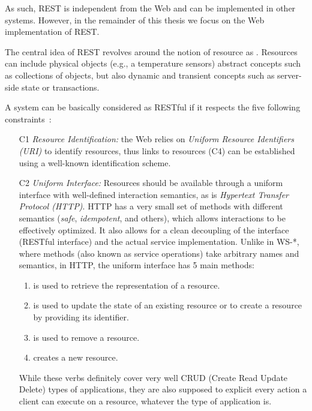 As such, REST is independent from the Web and can be implemented in other systems. However, in the remainder of this thesis we focus on the Web implementation of REST.

The central idea of REST revolves around the notion of resource as . Resources can include physical objects (e.g., a temperature sensors) abstract concepts such as collections of objects, but also dynamic and transient concepts such as server-side state or transactions. 

A system can be basically considered as RESTful if it respects the five following constraints~\cite{Fielding2000}:

\begin{itemize}
\item[C1] \emph{Resource Identification:} the Web relies on \emph{Uniform Resource Identifiers (URI)} to identify resources, thus links to resources (C4) can be established using a well-known identification scheme.

\item[C2] \emph{Uniform Interface:} Resources should be available through a uniform interface with well-defined interaction semantics, as is \emph{Hypertext Transfer Protocol (HTTP)}. HTTP has a very small set of methods with different semantics (\emph{safe}, \emph{idempotent}, and others), which allows interactions to be effectively optimized. It also allows for a clean decoupling of the interface (RESTful interface) and the actual service implementation. Unlike in WS-*, where methods (also known as service operations) take arbitrary names and semantics, in HTTP, the uniform interface has 5 main methods:
\begin{enumerate}
\item {} is used to retrieve the representation of a resource.
\item {} is used to update the state of an existing resource or to create a resource by providing its identifier.
\item {} is used to remove a resource.
\item {} creates a new resource.
\end{enumerate}

While these verbs definitely cover very well CRUD (Create Read Update Delete) types of applications, they are also supposed to explicit every action a client can execute on a resource, whatever the type of application is.


\end{itemize}
